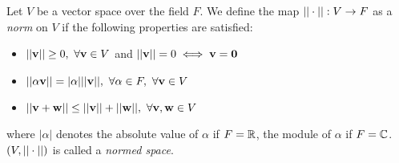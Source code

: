 

\begin{definition}
    Let $V$ be a vector space over the field $F$. We define the map $||\cdot||: V \rightarrow F$ as a \textit{norm} on $V$ if the following properties are satisfied:
    \begin{itemize}
        \item $||\mathbf{v}|| \geq 0,\ \forall \mathbf{v} \in V$ and $||\mathbf{v}|| = 0 \iff \mathbf{v} = \mathbf{0}$
        \item $||\alpha\mathbf{v}|| = |\alpha|||\mathbf{v}||,\ \forall \alpha \in F,\ \forall \mathbf{v} \in V$
        \item $||\mathbf{v} + \mathbf{w}|| \leq ||\mathbf{v}|| + ||\mathbf{w}||,\ \forall \mathbf{v}, \mathbf{w} \in V$
    \end{itemize}
    where $|\alpha|$ denotes the absolute value of $\alpha$ if $F = \mathbb{R}$, the module of $\alpha$ if $F = \mathbb{C}$. $(V, ||\cdot||)$ is called a \textit{normed space}.
\end{definition}







